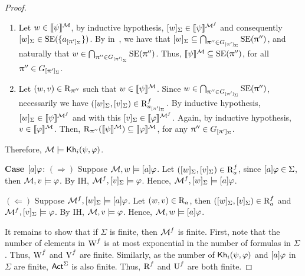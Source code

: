 \begin{proof}
    \begin{enumerate}
        \item Let $w \in \llbracket \psi \rrbracket^{\mathcal{M}}$, by inductive hypothesis, $[w]_\Sigma \in \llbracket \psi \rrbracket^{\mathcal{M}^f}$ and consequently $[w]_\Sigma \in \operatorname{SE}(\{ a_{[\uppi']_\Sigma} \})$.
        By  in~, we have that $[w]_\Sigma \subseteq \bigcap_{\uppi'' \in G_{[\uppi']_\Sigma}} \operatorname{SE}(\uppi'')$, and naturally that $w \in \bigcap_{\uppi'' \in G_{[\uppi']_\Sigma}} \operatorname{SE}(\uppi'')$.
        Thus, $\llbracket \psi \rrbracket^{\mathcal{M}} \subseteq \operatorname{SE}(\uppi'')$, for all $\uppi'' \in G_{[\uppi']_\Sigma}$.

        \item Let $(w,v) \in \operatorname{R}_{\uppi''}$ such that $w \in \llbracket \psi \rrbracket^{\mathcal{M}}$.
        Since $w \in \bigcap_{\uppi'' \in G_{[\uppi']_\Sigma}} \operatorname{SE}(\uppi'')$, necessarily we have $([w]_\Sigma,[v]_\Sigma) \in \operatorname{R}^f_{a_{[\uppi']_\Sigma}}$.
        By inductive hypothesis, $[w]_\Sigma \in \llbracket \psi \rrbracket^{\mathcal{M}^f}$ and with this $[v]_\Sigma \in \llbracket \varphi \rrbracket^{\mathcal{M}^f}$.
        Again, by inductive hypothesis, $v \in \llbracket \varphi \rrbracket^{\mathcal{M}}$. Then, $\operatorname{R}_{\uppi''}(\llbracket \psi \rrbracket^{\mathcal{M}}) \subseteq \llbracket \varphi \rrbracket^{\mathcal{M}}$, for any $\uppi'' \in G_{[\uppi']_\Sigma}$.
    \end{enumerate}

Therefore, $\mathcal{M} \models {\sf Kh}_i(\psi,\varphi)$. 
\smallskip

\noindent
\textbf{Case $[a]\varphi$}: $(\Rightarrow)$ Suppose $\mathcal{M},w \models [a]\varphi$.
Let $([w]_\Sigma,[v]_\Sigma) \in \operatorname{R}^f_a$, since $[a]\varphi \in \Sigma$, then $\mathcal{M},v \models \varphi$.
By IH, $\mathcal{M}^f,[v]_\Sigma \models \varphi$.
Hence, $\mathcal{M}^f,[w]_\Sigma \models [a]\varphi$.

$(\Leftarrow)$ Suppose $\mathcal{M}^f,[w]_\Sigma \models [a]\varphi$.
Let $(w,v) \in \operatorname{R}_a$, then $([w]_\Sigma,[v]_\Sigma) \in \operatorname{R}^f_a$ and $\mathcal{M}^f,[v]_\Sigma \models \varphi$.
By IH, $\mathcal{M},v \models \varphi$.
Hence, $\mathcal{M},w \models [a]\varphi$.
\smallskip

It remains to show that if $\Sigma$ is finite, then $\mathcal{M}^f$ is finite.
First, note that the number of elements in $\operatorname{W}^f$ is at most exponential in the number of formulas in $\Sigma$.
Thus, $\operatorname{W}^f$ and $\operatorname{V}^f$ are finite. Similarly, as the number of ${\sf Kh}_i(\psi,\varphi)$ and $[a] \varphi$ in $\Sigma$ are finite, ${\rm \sf Act}^{\Sigma}$ is also finite.
Thus, $\operatorname{R}^f$ and $\operatorname{U}^f$ are both finite.
\end{proof}

